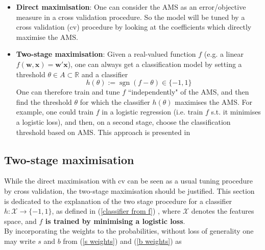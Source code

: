 \documentclass[]{article}
\begin{document}
\begin{itemize}
\item \textbf{Direct maximisation}: One can consider the AMS as an error/objective measure in a cross validation procedure. So the model will be tuned by a cross validation (cv) procedure by looking at the coefficients which directly maximise the AMS.

\item \textbf{Two-stage maximisation}: Given a real-valued function $f$ (e.g. a linear $f(\bm{w},\bm{x})=\bm{w}'\bm{x}$), one can always get a classification model by setting a threshold $\theta \in A\subset \mathbb{R}$ and a classifier
\begin{equation}
\label{classifier from f}
h(\theta):=\operatorname{sgn}(f-\theta)\in \{-1,1\}
\end{equation}
One can therefore train and tune $f$ ``independently" of the AMS, and then find the threshold $\theta$ for which the classifier $h(\theta)$ maximises the AMS. For example, one could train $f$ in a logistic regression (i.e. train $f$ s.t. it minimises a logistic loss), and then, on a second stage, choose the classification threshold based on AMS. This approach is presented in \cite{kotlowski2014consistent}
\end{itemize}

\subsection{Two-stage maximisation}

While the direct maximisation with cv can be seen as a usual tuning procedure by cross validation, the two-stage maximisation should be justified. This section is dedicated to the explanation of the two stage procedure for a  classifier $h:\mathcal{X}\to \{-1,1\}$, as defined in (\ref{classifier from f}) , where $\mathcal{X}$ denotes the features space, and \textbf{$f$ is trained by minimising a logistic loss}.\\

By incorporating the weights to the probabilities, without loss of generality one may write  $s$ and $b$ from (\ref{s weights}) and (\ref{b weights}) as
\end{document}
